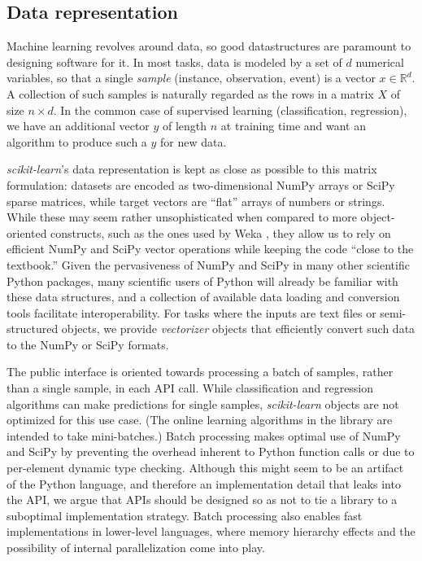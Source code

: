 \documentclass[twocolumn]{article}
\newcommand{\sklearn}{\textit{scikit-learn}\xspace}
\begin{document}
\subsection{Data representation}
\label{sec:arrays}

Machine learning revolves around data,
so good datastructures are paramount to designing software for it.
In most tasks, data is modeled by a set of $d$ numerical variables,
so that a single \textit{sample} (instance, observation, event)
is a vector $x \in \mathbb{R}^d$.
A collection of such samples is naturally regarded
as the rows in a matrix $X$ of size $n \times d$.
In the common case of supervised learning (classification, regression),
we have an additional vector $y$ of length $n$ at training time
and want an algorithm to produce such a $y$ for new data.

\sklearn's data representation is kept as close as possible
to this matrix formulation: datasets are encoded as
two-dimensional NumPy arrays or SciPy sparse matrices,
while target vectors are ``flat'' arrays of numbers or strings.
While these may seem rather unsophisticated when
compared to more object-oriented constructs, such as the ones used by
Weka \citep{hall2009weka},
they allow us to rely on efficient NumPy and SciPy vector operations
while keeping the code ``close to the textbook.''
Given the pervasiveness of NumPy and SciPy in many other scientific Python
packages, many scientific users of Python
will already be familiar with these data structures,
and a collection of available data loading and conversion tools
facilitate interoperability.
For tasks where the inputs are text files or semi-structured
objects, we provide \textit{vectorizer} objects that efficiently convert such
data to the NumPy or SciPy formats.

The public interface is oriented towards processing a batch of samples,
rather than a single sample, in each API call. While classification
and regression algorithms can make predictions for single samples,
\sklearn objects are not optimized for this use case. (The online learning
algorithms in the library are intended to take mini-batches.) Batch processing makes
optimal use of NumPy and SciPy by preventing the overhead inherent to Python
function calls or due to per-element dynamic type checking. Although this might
seem to be an artifact of the Python language, and therefore an implementation
detail that leaks into the API, we argue that APIs should be designed so as not
to tie a library to a suboptimal implementation strategy.
Batch processing also enables fast implementations in lower-level languages, where memory
hierarchy effects and the possibility of internal parallelization come into
play.
\end{document}
